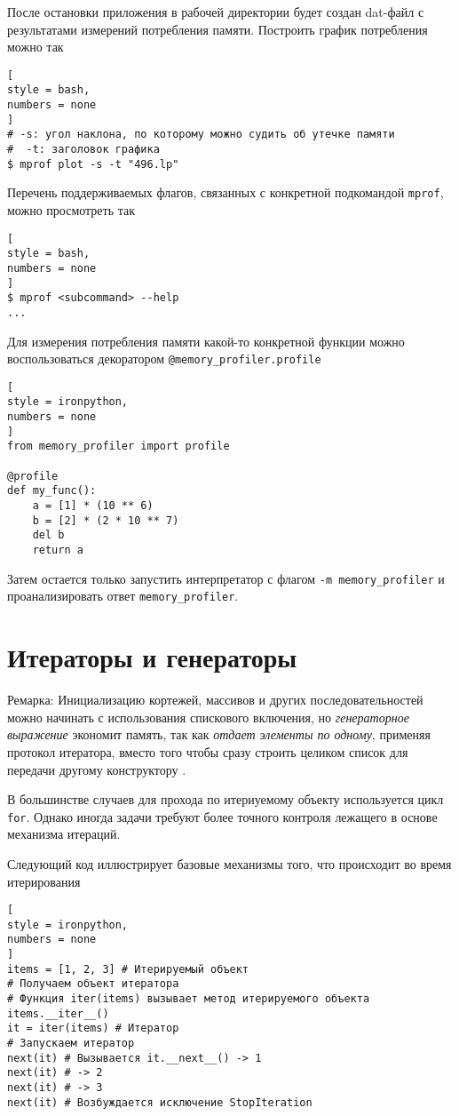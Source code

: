 \documentclass[%
	11pt,
	a4paper,
	utf8,
		]{article}
\begin{document}
После остановки приложения в рабочей директории будет создан dat-файл с результатами измерений потребления памяти. Построить график потребления можно так
\begin{lstlisting}[
style = bash,
numbers = none
]
# -s: угол наклона, по которому можно судить об утечке памяти
#  -t: заголовок графика
$ mprof plot -s -t "496.lp"
\end{lstlisting}

Перечень поддерживаемых флагов, связанных с конкретной подкомандой \texttt{mprof}, можно просмотреть так
\begin{lstlisting}[
style = bash,
numbers = none
]
$ mprof <subcommand> --help
...
\end{lstlisting}

Для измерения потребления памяти какой-то конкретной функции можно воспользоваться декоратором \texttt{@memory\_profiler.profile}
\begin{lstlisting}[
style = ironpython,
numbers = none
]
from memory_profiler import profile

@profile
def my_func():
    a = [1] * (10 ** 6)
    b = [2] * (2 * 10 ** 7)
    del b
    return a
\end{lstlisting}

Затем остается только запустить интерпретатор с флагом \verb|-m memory_profiler| и проанализировать ответ \texttt{memory\_profiler}.


\section{Итераторы и генераторы}

Ремарка: Инициализацию кортежей, массивов и других последовательностей можно начинать с использования спискового включения, но \emph{генераторное выражение} экономит память, так как \emph{отдает элементы по одному}, применяя протокол итератора, вместо того чтобы сразу строить целиком список для передачи другому конструктору \cite[]{ramalho:python-2022}.

В большинстве случаев для прохода по итериуемому объекту используется цикл \texttt{for}. Однако иногда задачи требуют более точного контроля лежащего в основе механизма итераций. 

Следующий код иллюстрирует базовые механизмы того, что происходит во время итерирования
\begin{lstlisting}[
style = ironpython,
numbers = none
]
items = [1, 2, 3] # Итерируемый объект
# Получаем объект итератора
# Функция iter(items) вызывает метод итерируемого объекта items.__iter__()
it = iter(items) # Итератор
# Запускаем итератор
next(it) # Вызывается it.__next__() -> 1
next(it) # -> 2
next(it) # -> 3
next(it) # Возбуждается исключение StopIteration
\end{lstlisting}
\end{document}
